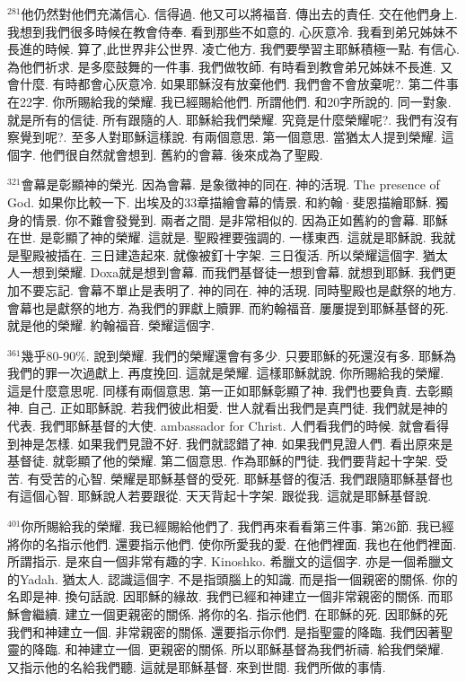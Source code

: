 \documentclass{book}
\begin{document}
$^{281}$他仍然對他們充滿信心.
信得過.
他又可以將福音.
傳出去的責任.
交在他們身上.
我想到我們很多時候在教會侍奉.
看到那些不如意的.
心灰意冷.
我看到弟兄姊妹不長進的時候.
算了,此世界非公世界.
凌亡他方.
我們要學習主耶穌積極一點.
有信心.
為他們祈求.
是多麼鼓舞的一件事.
我們做牧師.
有時看到教會弟兄姊妹不長進.
又會什麼.
有時都會心灰意冷.
如果耶穌沒有放棄他們.
我們會不會放棄呢?.
第二件事在22字.
你所賜給我的榮耀.
我已經賜給他們.
所謂他們.
和20字所說的.
同一對象.
就是所有的信徒.
所有跟隨的人.
耶穌給我們榮耀.
究竟是什麼榮耀呢?.
我們有沒有察覺到呢?.
至多人對耶穌這樣說.
有兩個意思.
第一個意思.
當猶太人提到榮耀.
這個字.
他們很自然就會想到.
舊約的會幕.
後來成為了聖殿.

$^{321}$會幕是彰顯神的榮光.
因為會幕.
是象徵神的同在.
神的活現.
The presence of God.
如果你比較一下.
出埃及的33章描繪會幕的情景.
和約翰·斐恩描繪耶穌.
獨身的情景.
你不難會發覺到.
兩者之間.
是非常相似的.
因為正如舊約的會幕.
耶穌在世.
是彰顯了神的榮耀.
這就是.
聖殿裡要強調的.
一樣東西.
這就是耶穌說.
我就是聖殿被插在.
三日建造起來.
就像被釘十字架.
三日復活.
所以榮耀這個字.
猶太人一想到榮耀.
Doxa就是想到會幕.
而我們基督徒一想到會幕.
就想到耶穌.
我們更加不要忘記.
會幕不單止是表明了.
神的同在.
神的活現.
同時聖殿也是獻祭的地方.
會幕也是獻祭的地方.
為我們的罪獻上贖罪.
而約翰福音.
屢屢提到耶穌基督的死.
就是他的榮耀.
約翰福音.
榮耀這個字.

$^{361}$幾乎80-90\%.
說到榮耀.
我們的榮耀還會有多少.
只要耶穌的死還沒有多.
耶穌為我們的罪一次過獻上.
再度挽回.
這就是榮耀.
這樣耶穌就說.
你所賜給我的榮耀.
這是什麼意思呢.
同樣有兩個意思.
第一正如耶穌彰顯了神.
我們也要負責.
去彰顯神.
自己.
正如耶穌說.
若我們彼此相愛.
世人就看出我們是真門徒.
我們就是神的代表.
我們耶穌基督的大使.
ambassador for Christ.
人們看我們的時候.
就會看得到神是怎樣.
如果我們見證不好.
我們就認錯了神.
如果我們見證人們.
看出原來是基督徒.
就彰顯了他的榮耀.
第二個意思.
作為耶穌的門徒.
我們要背起十字架.
受苦.
有受苦的心智.
榮耀是耶穌基督的受死.
耶穌基督的復活.
我們跟隨耶穌基督也有這個心智.
耶穌說人若要跟從.
天天背起十字架.
跟從我.
這就是耶穌基督說.

$^{401}$你所賜給我的榮耀.
我已經賜給他們了.
我們再來看看第三件事.
第26節.
我已經將你的名指示他們.
還要指示他們.
使你所愛我的愛.
在他們裡面.
我也在他們裡面.
所謂指示.
是來自一個非常有趣的字.
Kinoshko.
希臘文的這個字.
亦是一個希臘文的Yadah.
猶太人.
認識這個字.
不是指頭腦上的知識.
而是指一個親密的關係.
你的名即是神.
換句話說.
因耶穌的緣故.
我們已經和神建立一個非常親密的關係.
而耶穌會繼續.
建立一個更親密的關係.
將你的名.
指示他們.
在耶穌的死.
因耶穌的死我們和神建立一個.
非常親密的關係.
還要指示你們.
是指聖靈的降臨.
我們因著聖靈的降臨.
和神建立一個.
更親密的關係.
所以耶穌基督為我們祈禱.
給我們榮耀.
又指示他的名給我們聽.
這就是耶穌基督.
來到世間.
我們所做的事情.
\end{document}
